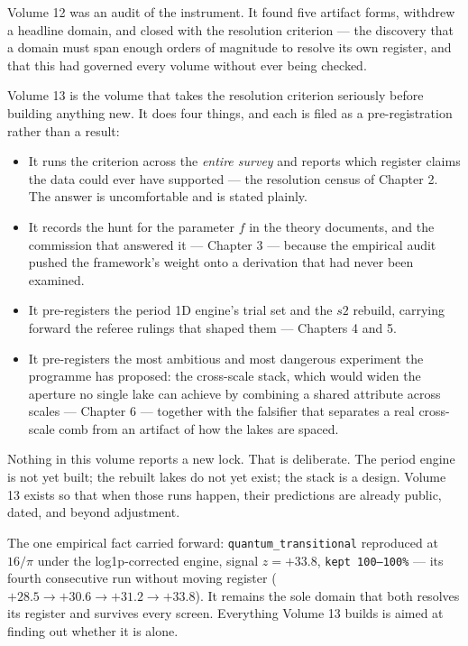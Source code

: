 \documentclass[11pt, letterpaper, openany]{book}
\begin{document}
Volume 12 was an audit of the instrument. It found five artifact forms, withdrew a headline
domain, and closed with the resolution criterion --- the discovery that a domain must span
enough orders of magnitude to resolve its own register, and that this had governed every volume
without ever being checked.

Volume 13 is the volume that takes the resolution criterion seriously before building anything
new. It does four things, and each is filed as a pre-registration rather than a result:

\begin{itemize}
    \item It runs the criterion across the \emph{entire survey} and reports which register
          claims the data could ever have supported --- the resolution census of Chapter 2. The
          answer is uncomfortable and is stated plainly.
    \item It records the hunt for the parameter $f$ in the theory documents, and the commission
          that answered it --- Chapter 3 --- because the empirical audit pushed the framework's
          weight onto a derivation that had never been examined.
    \item It pre-registers the period 1D engine's trial set and the $s2$ rebuild, carrying
          forward the referee rulings that shaped them --- Chapters 4 and 5.
    \item It pre-registers the most ambitious and most dangerous experiment the programme has
          proposed: the cross-scale stack, which would widen the aperture no single lake can
          achieve by combining a shared attribute across scales --- Chapter 6 --- together with
          the falsifier that separates a real cross-scale comb from an artifact of how the
          lakes are spaced.
\end{itemize}

Nothing in this volume reports a new lock. That is deliberate. The period engine is not yet
built; the rebuilt lakes do not yet exist; the stack is a design. Volume 13 exists so that when
those runs happen, their predictions are already public, dated, and beyond adjustment.

\begin{signalbox}
The one empirical fact carried forward: \texttt{quantum\_transitional} reproduced at $16/\pi$
under the log1p-corrected engine, signal $z = +33.8$, \texttt{kept 100--100\%} --- its fourth
consecutive run without moving register ($+28.5 \to +30.6 \to +31.2 \to +33.8$). It remains the
sole domain that both resolves its register and survives every screen. Everything Volume 13
builds is aimed at finding out whether it is alone.
\end{signalbox}
\end{document}
